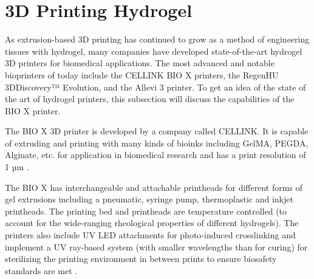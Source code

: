 \section{3D Printing Hydrogel}
As extrusion-based 3D printing has continued to grow as a method of engineering tissues with hydrogel, many companies have developed state-of-the-art hydrogel 3D printers for biomedical applications. The most advanced and notable bioprinters of today include the CELLINK BIO X printers, the RegenHU 3DDiscovery™ Evolution, and the Allevi 3 printer. To get an idea of the state of the art of hydrogel printers, this subsection will discuss the capabilities of the BIO X printer.

The BIO X 3D printer is developed by a company called CELLINK. It is capable of extruding and printing with many kinds of bioinks including GelMA, PEGDA, Alginate, etc. for application in biomedical research and has a print resolution of 1 µm \citep{biox_brochure}. 

The BIO X has interchangeable and attachable printheads for different forms of gel extrusions including a pneumatic, syringe pump, thermoplastic and inkjet printheads. The printing bed and printheads are temperature controlled (to account for the wide-ranging rheological properties of different hydrogels). The printers also include UV LED attachments for photo-induced crosslinking and implement a UV ray-based system (with smaller wavelengths than for curing) for sterilizing the printing environment in between prints to ensure biosafety standards are met \citep{biox_brochure}.

